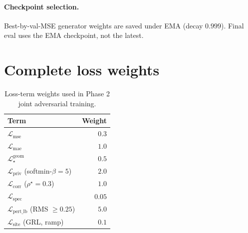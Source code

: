 \paragraph{Checkpoint selection.} Best-by-val-MSE generator weights are saved under EMA (decay $0.999$). Final eval uses the EMA checkpoint, not the latest.

\section{Complete loss weights}
\label{app:loss_weights}

\begin{table}[h]
\caption{Loss-term weights used in Phase 2 joint adversarial training.}
\centering\small
\begin{tabular}{lr}
\toprule
Term & Weight \\
\midrule
$\mathcal{L}_{\text{mse}}$ & $0.3$ \\
$\mathcal{L}_{\text{mae}}$ & $1.0$ \\
$\mathcal{L}_\star^{\text{geom}}$ & $0.5$ \\
$\mathcal{L}_{\text{priv}}$ (softmin-$\beta\!=\!5$) & $2.0$ \\
$\mathcal{L}_{\text{corr}}$ ($\rho^\star\!=\!0.3$) & $1.0$ \\
$\mathcal{L}_{\text{spec}}$ & $0.05$ \\
$\mathcal{L}_{\text{pert\_lb}}$ (RMS $\ge\!0.25$) & $5.0$ \\
$\mathcal{L}_{\text{site}}$ (GRL, ramp) & $0.1$ \\
\bottomrule
\end{tabular}
\end{table}
